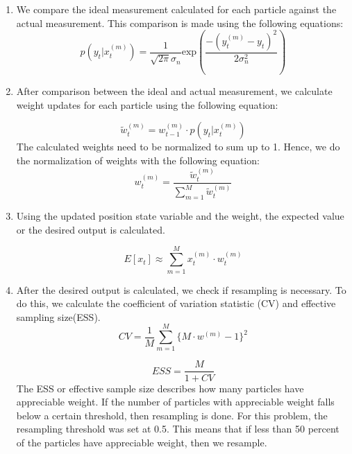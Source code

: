 \documentclass{article}
\begin{document}
\begin{enumerate}
\item We compare the ideal measurement calculated for each particle against the actual measurement. This comparison is made using the following equations:
\begin{equation}
	p(y_t | x_t^{(m)}) = 
	\frac{1}{\sqrt{2 \pi} \sigma_n}
	\mathrm{exp} ( \frac{-(y_t^{(m)} - y_t)^2}{2 \sigma_n^2} )
\label{eq:6}
\end{equation}

\item After comparison between the ideal and actual measurement, we calculate weight updates for each particle using the following equation:

\begin{equation}
\tilde{w}_t^{(m)} = w_{t-1}^{(m)} \cdot p(y_t | x_t^{(m)})
\label{eq:7}
\end{equation}
The calculated weights need to be normalized to sum up to 1. Hence, we do the normalization of weights with the following equation:
\begin{equation}
	w_t^{(m)} = \frac{\tilde{w}_t^{(m)}}{\sum_{m=1}^M \tilde{w}_t^{(m)}}
\label{eq:8}
\end{equation}
 \item Using the updated position state variable and the weight, the expected value or the desired output is calculated.

\begin{equation}
	E[x_t] \approx \sum_{m=1}^M x_t^{(m)} \cdot w_t^{(m)}
\label{eq:9}
\end{equation}

\item After the desired output is calculated, we check if resampling is necessary. To do this, we calculate the coefficient of variation statistic (CV) and effective sampling size(ESS).
\begin{equation}
	CV = \frac{1}{M} \sum_{m=1}^{M}\lbrace M \cdot w^{(m)} - 1 \rbrace ^ 2
\label{eq:10}
\end{equation} 


\begin{equation}
	ESS = \frac{M}{1 + CV}
	\label{eq:11}
\end{equation}
The ESS or effective sample size describes how many particles have appreciable weight. If the number of particles with appreciable weight falls below a certain threshold, then resampling is done. For this problem, the resampling threshold was set at 0.5. This means that if less than 50 percent of the particles have appreciable weight, then we resample.\\


\end{enumerate}
\end{document}
